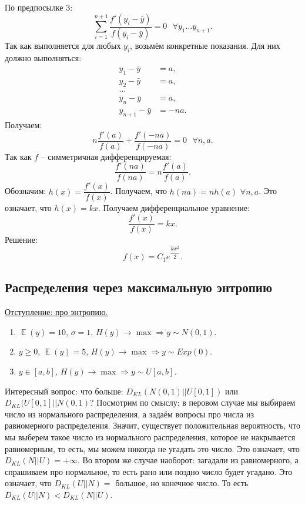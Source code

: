 \documentclass[10pt, a4paper]{extarticle}
\DeclareMathOperator{\E}{\mathbb{E}}
\begin{document}
По предпосылке 3:
\[
\sum_{i=1}^{n+1} \dfrac{f'(y_i-\bar{y})}{f(y_i-\bar{y})} = 0 \text{ } \forall y_1 \dots y_{n+1}.
\]
Так как выполняется для любых $y_i$, возьмём конкретные показания. Для них должно выполняться:
\begin{align*}
y_1 - \bar{y} &= a, \\
y_2 - \bar{y} &= a, \\
\dots \\
y_n - \bar{y} &= a, \\
y_{n+1} - \bar{y} &= -na.
\end{align*}
Получаем:
\[
n \dfrac{f'(a)}{f(a)} + \dfrac{f'(-na)}{f(-na)} = 0 \text{ } \forall n, a. 
\]
Так как $f$ -- симметричная дифференцируемая:
\[
\dfrac{f'(na)}{f(na)} = n \dfrac{f'(a)}{f(a)}.
\]
Обозначим: $h(x) = \dfrac{f'(x)}{f(x)}$. Получаем, что $h(na) = nh(a)$ $\forall n, a$. Это означает, что $h(x) = kx$. Получаем дифференциальное уравнение:
\[
\dfrac{f'(x)}{f(x)} = kx.
\]
Решение:
\[
f(x) = C_1e^{\dfrac{kx^2}{2}}.
\]

\subsection{Распределения через максимальную энтропию}

\hyperlink{entropy}{Отступление: про энтропию.}

\begin{enumerate}
	\item $\E(y) = 10$, $\sigma = 1$, $H(y) \rightarrow \max \Rightarrow y \sim N(0,1)$.
	\item $y \ge 0$, $\E(y) = 5$, $H(y) \rightarrow \max \Rightarrow y \sim Exp(0)$.
	\item $y \in [a, b]$, $H(y) \rightarrow \max \Rightarrow y \sim U[a, b]$.
\end{enumerate}

Интересный вопрос: что больше: $D_{KL}(N(0,1) || U[0, 1])$ или $D_{KL}(U[0,1] || N(0, 1)$? Посмотрим по смыслу: в перовом случае мы выбираем число из нормального распределения, а задаём вопросы про числа из равномерного распределения. Значит, существует положительная вероятность, что мы выберем такое число из нормального распределения, которое не накрывается равномерным, то есть, мы можем никогда не угадать это число. Это означает, что $D_{KL}(N || U) = +\infty$. Во втором же случае наоборот: загадали из равномерного, а спрашиваем про нормальное, то есть рано или поздно число будет угадано. Это означает, что  $D_{KL}(U || N) = $ большое, но конечное число. То есть $D_{KL}(U || N) < D_{KL}(N || U)$. 
\end{document}
